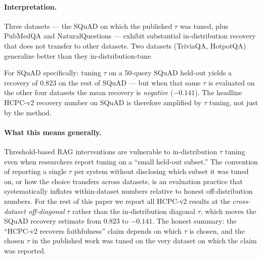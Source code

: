 \paragraph{Interpretation.}
Three datasets --- the SQuAD on which the published $\tau$ was
tuned, plus PubMedQA and NaturalQuestions --- exhibit substantial
in-distribution recovery that does not transfer to other datasets.
Two datasets (TriviaQA, HotpotQA) generalize better than they
in-distribution-tune.

For SQuAD specifically: tuning $\tau$ on a 50-query SQuAD held-out
yields a recovery of $0.823$ on the rest of SQuAD --- but when that
same $\tau$ is evaluated on the other four datasets the mean
recovery is \emph{negative} ($-0.141$). The headline HCPC-v2
recovery number on SQuAD is therefore amplified by $\tau$ tuning,
not just by the method.

\paragraph{What this means generally.}
Threshold-based RAG interventions are vulnerable to in-distribution
$\tau$ tuning even when researchers report tuning on a
``small held-out subset.'' The convention of reporting a single
$\tau$ per system without disclosing which subset it was tuned on,
or how the choice transfers across datasets, is an evaluation
practice that systematically inflates within-dataset numbers
relative to honest off-distribution numbers.
For the rest of this paper we report all HCPC-v2 results at the
\emph{cross-dataset off-diagonal} $\tau$ rather than the
in-distribution diagonal $\tau$, which moves the SQuAD recovery
estimate from $0.823$ to $-0.141$. The honest summary: the
``HCPC-v2 recovers faithfulness'' claim depends on which $\tau$ is
chosen, and the chosen $\tau$ in the published work was tuned on
the very dataset on which the claim was reported.
